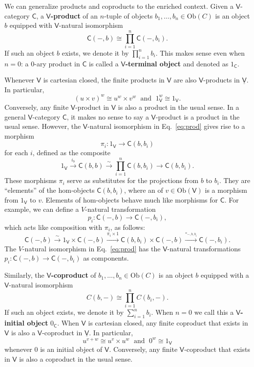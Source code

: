 \documentclass{amsart}
\newcommand{\define}[1]{{\bf \boldmath{#1}}}
\theoremstyle{definition}
\newcommand{\V}{\mathsf{V}}
\newcommand{\C}{\mathsf{C}}
\newcommand{\Obj}{\mathrm{Ob}}
\newcommand{\maps}{\colon}
\begin{document}
We can generalize products and coproducts to the enriched context.
Given a $\V$-category $\C$,  a \textbf{$\V$-product} of an $n$-tuple of 
objects $b_1, \dots , b_n \in \Obj(C)$ is an object $b$ equipped with $\V$-natural
isomorphism
\begin{equation}
\label{eq:prod}          \C(-,b) \cong \prod_{i=1}^n \C(-,b_i). 
\end{equation}
If such an object $b$ exists, we denote it by $\prod_{i=1}^n b_i$.   This makes sense
even when $n = 0$: a 0-ary product in $\C$ is called a \textbf{$\V$-terminal object} and denoted
as $1_\C$.  

Whenever $\V$ is cartesian closed, the finite products in $\V$ are also $\V$-products in 
$\underline{\V}$.  In particular,
\[           (u \times v)^w \cong u^w \times v^w \; \textrm{ and } \; 1_\V^w \cong 1_\V .\]
Conversely, any finite $\V$-product in $\V$ is also a product in the usual sense. 
In a general $\V$-category $\C$, it makes no sense to say a $\V$-product is a product
in the usual sense.  However, the $\V$-natural isomorphism in Eq.\ \eqref{eq:prod} gives rise
to a morphism
\[    \pi_i \maps 1_\V \to \C(b,b_i)  \]
for each $i$, defined as the composite
\[    1_\V \stackrel{i_b}{\longrightarrow} \C(b,b) \stackrel{\sim}{\longrightarrow} \prod_{i=1}^n \C(b,b_i) \longrightarrow \C(b,b_i) .\]
These morphisms $\pi_i$ serve as substitutes for the projections from $b$ to $b_i$.  They are  ``elements'' of the hom-objects $\C(b,b_i)$, where an \define{element} of $v \in \Obj(\V)$ is a 
morphism from $1_\V$ to $v$.    Elements of hom-objects behave much like morphisms for 
$\C$.  For example, we can define a $V$-natural transformation
\[     p_i \maps \C(-,b) \to \C(-,b_i), \]
which acts like composition with $\pi_i$, as follows:
\[     \C(-,b) \stackrel{\sim}{\longrightarrow} 1_\V \times \C(-,b)  
 \stackrel{\pi_i \times 1}{\longrightarrow} \C(b,b_i) \times \C(-,b) \stackrel{\circ_{-,b,b_i}}{\longrightarrow} \C(-,b_i). \]
The $V$-natural isomorphism in Eq.\ \eqref{eq:prod} has the $\V$-natural transformations $p_i \maps \C(-,b) \to \C(-,b_i)$ as components.

Similarly, the \textbf{$\V$-coproduct} of $b_1, \dots, b_n \in \Obj(C)$ is an object $b$ equipped with a $\V$-natural isomorphism
\[           C(b,-) \cong \prod_{i = 1}^n C(b_i,-). \]
If such an object exists, we denote it by $\sum_{i=1}^n b_i$.  
When $n=0$ we call this a \textbf{$\V$-initial object} $0_\C$.   When $\V$ is cartesian
closed, any finite coproduct that exists in $\V$ is also a $\V$-coproduct in $\underline{\V}$.   In particular,
\[          u^{v+w} \cong u^v \times u^w \; \textrm{ and } \;  0^w \cong 1_\V \]
whenever $0$ is an initial object of $\V$.  Conversely, any finite $\V$-coproduct that
exists in $\V$ is also a coproduct in the usual sense.
\end{document}
